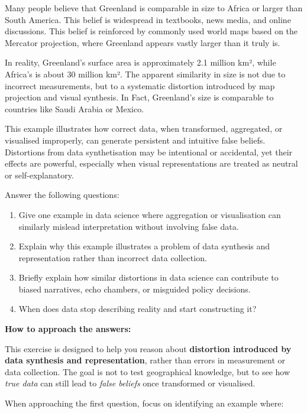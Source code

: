 \documentclass[
  12pt,
]{book}
\providecommand{\tightlist}{%
  \setlength{\itemsep}{0pt}\setlength{\parskip}{0pt}}
\begin{document}
Many people believe that Greenland is comparable in size to Africa or larger than South America. This belief is widespread in textbooks, news media, and online discussions. This belief is reinforced by commonly used world maps based on the Mercator projection, where Greenland appears vastly larger than it truly is.

In reality, Greenland's surface area is approximately 2.1 million km², while Africa's is about 30 million km². The apparent similarity in size is not due to incorrect measurements, but to a systematic distortion introduced by map projection and visual synthesis. In Fact, Greenland's size is comparable to countries like Saudi Arabia or Mexico.

This example illustrates how correct data, when transformed, aggregated, or visualised improperly, can generate persistent and intuitive false beliefs. Distortions from data synthetisation may be intentional or accidental, yet their effects are powerful, especially when visual representations are treated as neutral or self-explanatory.

Answer the following questions:

\begin{enumerate}
\def\labelenumi{\arabic{enumi}.}
\tightlist
\item
  Give one example in data science where aggregation or visualisation can similarly mislead interpretation without involving false data.
\item
  Explain why this example illustrates a problem of data synthesis and representation rather than incorrect data collection.
\item
  Briefly explain how similar distortions in data science can contribute to biased narratives, echo chambers, or misguided policy decisions.
\item
  When does data stop describing reality and start constructing it?
\end{enumerate}

\textbf{How to approach the answers:}

This exercise is designed to help you reason about \textbf{distortion introduced by data synthesis and representation}, rather than errors in measurement or data collection. The goal is not to test geographical knowledge, but to see how \emph{true data} can still lead to \emph{false beliefs} once transformed or visualised.

When approaching the first question, focus on identifying an example where:
\end{document}
